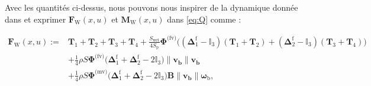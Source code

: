 
Avec les quantités ci-dessus, nous pouvons nous inspirer de la dynamique donnée dans  \cite[eqns (97),~(98)]{lustosaHal-03035938} et exprimer $\boldsymbol{F}_{\text{W}}(x,u)$ et $\boldsymbol{M}_{\text{W}}(x,u)$ dans \eqref{eq:Q} comme :

\begin{align}
\nonumber
\boldsymbol{F}_{\text{W}}(x,u) :={}&  \boldsymbol{T}_{1} + \boldsymbol{T}_{2} + \boldsymbol{T}_{3} + \boldsymbol{T}_{4} + \frac{S_{\text{wet}}}{4S_{\text{p}}} \boldsymbol{\Phi}^{\text{(fv)}} \Big( (\boldsymbol{\Delta}^{\text{f}}_1 - \mathbb{I}_{3} ) (\boldsymbol{T}_{1}+\boldsymbol{T}_{2}) + ( \boldsymbol{\Delta}^{\text{f}}_2 - \mathbb{I}_{3}) (\boldsymbol{T}_{3}+\boldsymbol{T}_{4})\Big) \\ 
     \label{eq:FbColibri}
    &+ \frac{1}{4} \rho S  \boldsymbol{\Phi}^{\text{(fv)}} \Big(\boldsymbol{\Delta}^{\text{f}}_1+ \boldsymbol{\Delta}^{\text{f}}_2 - 2 \mathbb{I}_{3} \Big) \lVert \boldsymbol{v_{\text{b}}} \rVert \boldsymbol{v_{\text{b}}}\\
    \nonumber
    &+ \frac{1}{4} \rho S \boldsymbol{\Phi}^{\text{(mv)}} \Big(\boldsymbol{\Delta}^{\text{f}}_1 + \boldsymbol{\Delta}^{\text{f}}_2 - 2\mathbb{I}_{3}\Big) \boldsymbol{B} \lVert \boldsymbol{v_{\text{b}}} \rVert  \boldsymbol{\omega}_{\text{b}}, 
\end{align}
